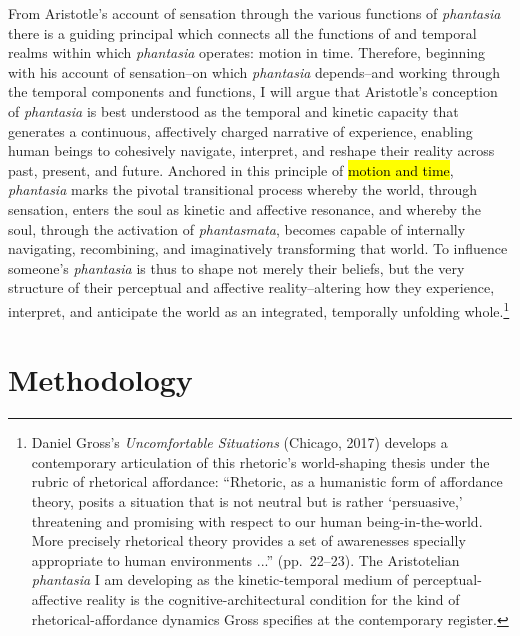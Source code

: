\documentclass{article}
\begin{document}
From Aristotle's account of sensation through the various functions of \textit{phantasia} there is a guiding principal which connects all the functions of and temporal realms within which \textit{phantasia} operates: motion in time. Therefore, beginning with his account of sensation--on which \textit{phantasia} depends--and working through the temporal components and functions, I will argue that Aristotle's conception of \textit{phantasia} is best understood as the temporal and kinetic capacity that generates a continuous, affectively charged narrative of experience, enabling human beings to cohesively navigate, interpret, and reshape their reality across past, present, and future. Anchored in this principle of \hl{motion and time}, \textit{phantasia} marks the pivotal transitional process whereby the world, through sensation, enters the soul as kinetic and affective resonance, and whereby the soul, through the activation of \textit{phantasmata}, becomes capable of internally navigating, recombining, and imaginatively transforming that world. To influence someone's \textit{phantasia} is thus to shape not merely their beliefs, but the very structure of their perceptual and affective reality--altering how they experience, interpret, and anticipate the world as an integrated, temporally unfolding whole.\footnote{Daniel Gross's \textit{Uncomfortable Situations} (Chicago, 2017) develops a contemporary articulation of this rhetoric's world-shaping thesis under the rubric of rhetorical affordance: ``Rhetoric, as a humanistic form of affordance theory, posits a situation that is not neutral but is rather `persuasive,' threatening and promising with respect to our human being-in-the-world. More precisely rhetorical theory provides a set of awarenesses specially appropriate to human environments ...'' (pp.~22--23). The Aristotelian \textit{phantasia} I am developing as the kinetic-temporal medium of perceptual-affective reality is the cognitive-architectural condition for the kind of rhetorical-affordance dynamics Gross specifies at the contemporary register.} 


\section{Methodology}
\end{document}
